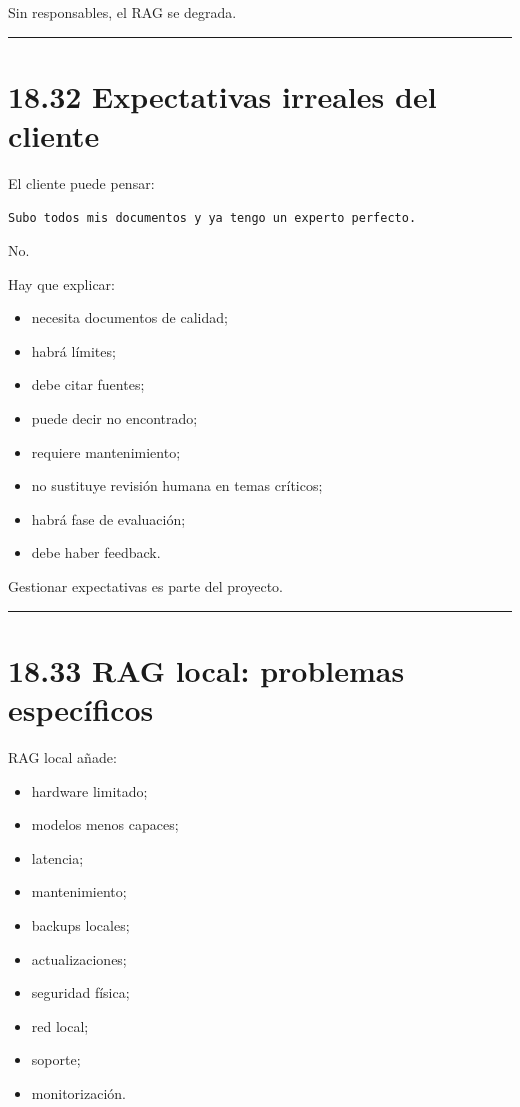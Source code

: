Sin responsables, el RAG se degrada.

\begin{center}\rule{0.5\linewidth}{0.5pt}\end{center}

\section{18.32 Expectativas irreales del
cliente}\label{expectativas-irreales-del-cliente}

El cliente puede pensar:

\begin{lstlisting}
Subo todos mis documentos y ya tengo un experto perfecto.
\end{lstlisting}

No.

Hay que explicar:

\begin{itemize}
\tightlist
\item
  necesita documentos de calidad;
\item
  habrá límites;
\item
  debe citar fuentes;
\item
  puede decir no encontrado;
\item
  requiere mantenimiento;
\item
  no sustituye revisión humana en temas críticos;
\item
  habrá fase de evaluación;
\item
  debe haber feedback.
\end{itemize}

Gestionar expectativas es parte del proyecto.

\begin{center}\rule{0.5\linewidth}{0.5pt}\end{center}

\section{18.33 RAG local: problemas
específicos}\label{rag-local-problemas-especuxedficos}

RAG local añade:

\begin{itemize}
\tightlist
\item
  hardware limitado;
\item
  modelos menos capaces;
\item
  latencia;
\item
  mantenimiento;
\item
  backups locales;
\item
  actualizaciones;
\item
  seguridad física;
\item
  red local;
\item
  soporte;
\item
  monitorización.
\end{itemize}

